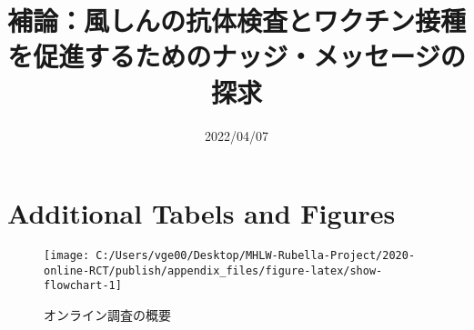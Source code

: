 \documentclass[
  11pt,
  a4paper,
]{article}
\title{補論：風しんの抗体検査とワクチン接種を促進するためのナッジ・メッセージの探求  }
\date{2022/04/07}
\begin{document}
\begin{spacing}{1}
  \maketitle
\end{spacing}

\hypertarget{appendix-appendix}{%
\appendix}


\hypertarget{additional-tabels-and-figures}{%
\section{Additional Tabels and Figures}\label{additional-tabels-and-figures}}

\begin{figure}[t]
\texttt{[image: C:/Users/vge00/Desktop/MHLW-Rubella-Project/2020-online-RCT/publish/appendix\_files/figure-latex/show-flowchart-1]} \caption{オンライン調査の概要}\label{fig:show-flowchart}
\end{figure}
\end{document}
